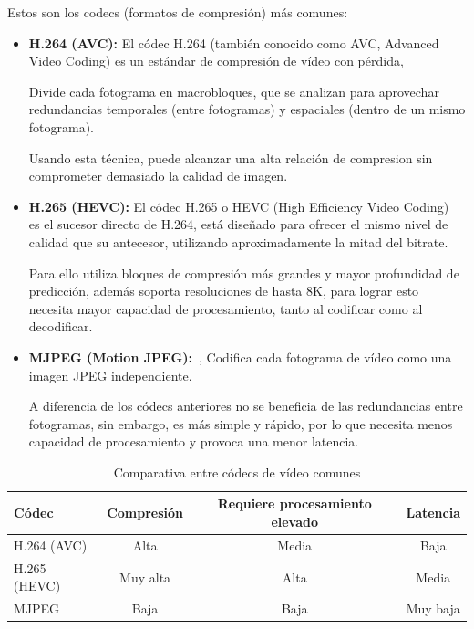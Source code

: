 Estos son los codecs (formatos de compresión) más comunes:
\begin{itemize}
    \item \textbf{H.264 (AVC):} El códec H.264 (también conocido como AVC, Advanced Video Coding)\cite{H.264} es un estándar de compresión de vídeo con pérdida,

    Divide cada fotograma en macrobloques, que se analizan para aprovechar redundancias temporales (entre fotogramas) y espaciales (dentro de un mismo fotograma).

    Usando esta técnica, puede alcanzar una alta relación de compresion sin comprometer demasiado la calidad de imagen.

    \item \textbf{H.265 (HEVC):} El códec H.265 o HEVC (High Efficiency Video Coding)~\cite{hevc_h265} es el sucesor directo de H.264, está diseñado para ofrecer el mismo nivel de calidad que su antecesor,
    utilizando aproximadamente la mitad del bitrate.

    Para ello utiliza bloques de compresión más grandes y mayor profundidad de predicción, además soporta resoluciones de hasta 8K, para lograr esto necesita mayor capacidad de procesamiento, tanto al codificar como al decodificar.

    \item \textbf{MJPEG (Motion JPEG):}~\cite{mjpeg_codec}, Codifica cada fotograma de vídeo como una imagen JPEG independiente.

    A diferencia de los códecs anteriores no se beneficia de las redundancias entre fotogramas, sin embargo, es más simple y rápido, por lo que necesita menos capacidad de procesamiento y provoca una menor latencia.

\end{itemize}
\begin{table}[h]
    \centering
    \footnotesize
    \begin{tabular}{|l|c|c|c|}
        \hline
        \textbf{Códec} & \textbf{Compresión} & \textbf{Requiere procesamiento elevado} & \textbf{Latencia} \\
        \hline
        H.264 (AVC)    & Alta                & Media                                   & Baja              \\
        \hline
        H.265 (HEVC)   & Muy alta            & Alta                                    & Media             \\
        \hline
        MJPEG          & Baja                & Baja                                    & Muy baja          \\
        \hline
    \end{tabular}
    \caption{Comparativa entre códecs de vídeo comunes}
    \label{tab:video_codecs}
\end{table}

